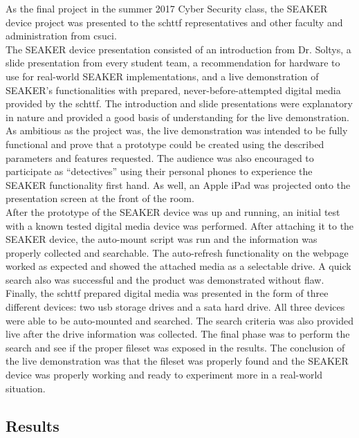\documentclass[12pt]{article}
\begin{document}
As the final project in the summer 2017 Cyber Security class, the SEAKER device
project was presented to the \gls{schttf} representatives and other faculty and
administration from \gls{csuci}.\\

The SEAKER device presentation consisted of an introduction from Dr. Soltys, a 
slide presentation from every student team, a recommendation for hardware to 
use for real-world SEAKER implementations, and a live demonstration of SEAKER's 
functionalities with prepared, never-before-attempted digital media provided by the
\gls{schttf}.  The introduction and slide presentations were explanatory in nature
and provided a good basis of understanding for the live demonstration.\\

As ambitious as the project was, the live demonstration was intended to be fully
functional and prove that a prototype could be created using the described
parameters and features requested.  The audience was also encouraged to participate
as ``detectives'' using their personal phones to experience the SEAKER functionality
first hand.  As well, an Apple iPad was projected onto the presentation screen at
the front of the room.\\

After the prototype of the SEAKER device was up and running, an initial test with a
known tested digital media device was performed.  After attaching it to the SEAKER
device, the auto-mount script was run and the information was properly collected
and searchable.  The auto-refresh functionality on the webpage worked as expected
and showed the attached media as a selectable drive.  A quick search also was 
successful and the product was demonstrated without flaw.\\

Finally, the \gls{schttf} prepared digital media was presented in the form of three
different devices: two \gls{usb} storage drives and a \gls{sata} hard drive.  All three devices
were able to be auto-mounted and searched.  The search criteria was also provided
live after the drive information was collected.  The final phase was to perform the
search and see if the proper fileset was exposed in the results.  The conclusion
of the live demonstration was that the fileset was properly found and the SEAKER
device was properly working and ready to experiment more in a real-world situation.

\subsection{Results}
\end{document}
